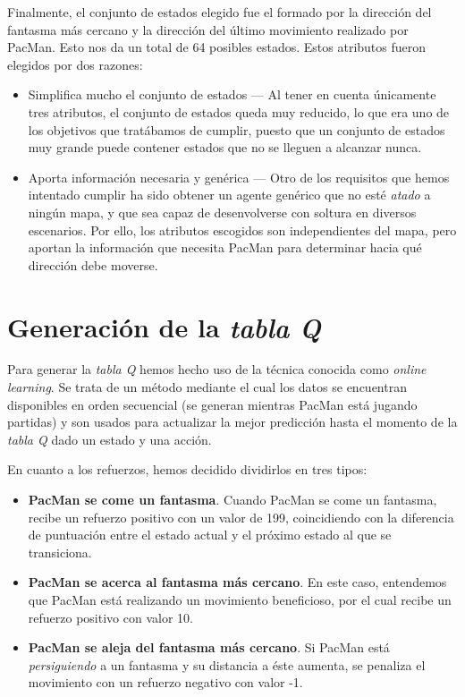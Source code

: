 \documentclass[12pt]{article}
\begin{document}
Finalmente, el conjunto de estados elegido fue el formado por la dirección del fantasma más cercano y la dirección del último movimiento realizado por PacMan. Esto nos da un total de 64 posibles estados. Estos atributos fueron elegidos por dos razones:
\begin{itemize}
	\item Simplifica mucho el conjunto de estados — Al tener en cuenta únicamente tres atributos, el conjunto de estados queda muy reducido, lo que era uno de los objetivos que tratábamos de cumplir, puesto que un conjunto de estados muy grande puede contener estados que no se lleguen a alcanzar nunca.
	\item Aporta información necesaria y genérica — Otro de los requisitos que hemos intentado cumplir ha sido obtener un agente genérico que no esté \textit{atado} a ningún mapa, y que sea capaz de desenvolverse con soltura en diversos escenarios. Por ello, los atributos escogidos son independientes del mapa, pero aportan la información que necesita PacMan para determinar hacia qué dirección debe moverse.
\end{itemize}

\section{Generación de la \textit{tabla Q}}

Para generar la \textit{tabla Q} hemos hecho uso de la técnica conocida como \textit{online learning}. Se trata de un método mediante el cual los datos se encuentran disponibles en orden secuencial (se generan mientras PacMan está jugando partidas) y son usados para actualizar la mejor predicción hasta el momento de la \textit{tabla Q} dado un estado y una acción.

En cuanto a los refuerzos, hemos decidido dividirlos en tres tipos:
\begin{itemize}
	\item \textbf{PacMan se come un fantasma}. Cuando PacMan se come un fantasma, recibe un refuerzo positivo con un valor de 199, coincidiendo con la diferencia de puntuación entre el estado actual y el próximo estado al que se transiciona.
	\item \textbf{PacMan se acerca al fantasma más cercano}. En este caso, entendemos que PacMan está realizando un movimiento beneficioso, por el cual recibe un refuerzo positivo con valor 10.
	\item \textbf{PacMan se aleja del fantasma más cercano}. Si PacMan está \textit{persiguiendo} a un fantasma y su distancia a éste aumenta, se penaliza el movimiento con un refuerzo negativo con valor -1.
\end{itemize}
\end{document}
